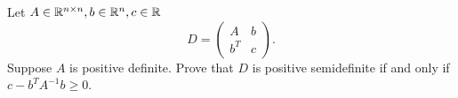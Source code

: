 \documentclass{ExerciseSheet}
\newif\ifsolutions
\begin{document}
\ifsolutions
\vskip 0.3cm
\begin{solution}
\begin{enumerate}
    \item Weierstrass is not applicable ($C$ not bounded). But $f$ is coerciveness, $C$ is non-empty and closed hence we know it has global minimum over $C$. 

    
\end{enumerate}
\end{solution}

\fi

\vskip 0.5cm
\begin{exo}
Let $A\in \mathbb{R}^{n \times n}, b\in\mathbb{R}^n, c\in \mathbb{R}$
\begin{equation*}
    D = \left(\begin{array}{rr}A & b \\ b^T &c \end{array}\right).
\end{equation*}
Suppose $A$ is positive definite. Prove that $D$ is positive semidefinite if and only if $c-b^TA^{-1}b\geq 0$.  
\end{exo}

\ifsolutions
\vskip 0.3cm
\begin{solution}
We can do the following decomposition of $D$
\begin{align*}
    \left(\begin{array}{rr} A & b \\ b^T &c \end{array}\right) &= \left(\begin{array}{rr} I & 0 \\ b^TA^{-1} & 1\end{array} \right) \left(\begin{array}{rr} A & 0 \\ 0 &c-b^TA^{-1}b \end{array}\right)
    \left(\begin{array}{rr} I & A^{-1}b \\ 0 & 1\end{array} \right).
\end{align*}
Therefore $D$ is positive semidefinite iff the middle matrix of the decomposition on the right hand side is positive semidefinite which is the case iff $c-b^TA^{-1}b\geq 0$. 
This also uses the fact that the matrix $\left(\begin{array}{rr} I & 0 \\ b^TA^{-1} & 1\end{array} \right) $ is invertible. 
\end{solution}

\fi
\end{document}
